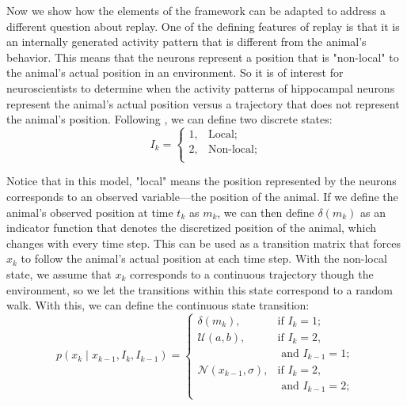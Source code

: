 \documentclass[conference]{IEEEtran}
\begin{document}
Now we show how the elements of the framework can be adapted to address a different question about replay. One of the defining features of replay is that it is an internally generated activity pattern that is different from the animal's behavior. This means that the neurons represent a position that is "non-local" to the animal's actual position in an environment. So it is of interest for neuroscientists to determine when the activity patterns of hippocampal neurons represent the animal's actual position versus a trajectory that does not represent the animal's position. Following \cite{EdenCharacterizingComplexMultiScale2018}, we can define two discrete states:
\begin{equation}
    I_{k} = \begin{cases}
        1, & \text{Local;}\\
        2, & \text{Non-local;}\\
         \end{cases}
\end{equation}

Notice that in this model, "local" means the position represented by the neurons corresponds to an observed variable---the position of the animal. If we define the animal's observed position at time $t_{k}$ as $m_{k}$, we can then define $\delta (m_{k})$ as an indicator function that denotes the discretized position of the animal, which changes with every time step. This can be used as a transition matrix that forces $x_k$ to follow the animal's actual position at each time step. With the non-local state, we assume that $x_k$ corresponds to a continuous trajectory though the environment, so we let the transitions within this state correspond to a random walk. With this, we can define the continuous state transition:
\begin{equation}
    p(x_{k} \mid x_{k-1}, I_{k}, I_{k-1}) = \begin{cases}
        \delta (m_{k}), & \text{if } I_{k}=1; \\
        \mathcal{U}(a, b), & \text{if } I_{k}=2, \\
        & \text{ and } I_{k-1}=1; \\
        \mathcal{N}(x_{k-1}, \sigma), & \text{if } I_{k}=2, \\
        & \text{ and } I_{k-1}=2;\\
        
    \end{cases}        
\end{equation}
\end{document}

